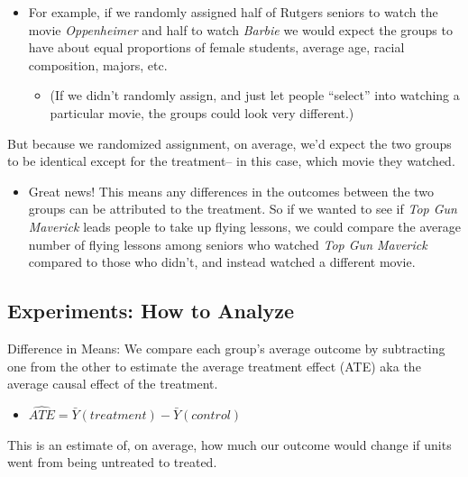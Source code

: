 \documentclass[
  letterpaper,
  DIV=11,
  numbers=noendperiod]{scrreprt}
\providecommand{\tightlist}{%
  \setlength{\itemsep}{0pt}\setlength{\parskip}{0pt}}\usepackage{longtable,booktabs,array}
\begin{document}
\begin{itemize}
\tightlist
\item
  For example, if we randomly assigned half of Rutgers seniors to watch
  the movie \emph{Oppenheimer} and half to watch \emph{Barbie} we would
  expect the groups to have about equal proportions of female students,
  average age, racial composition, majors, etc.

  \begin{itemize}
  \tightlist
  \item
    (If we didn't randomly assign, and just let people ``select'' into
    watching a particular movie, the groups could look very different.)
  \end{itemize}
\end{itemize}

But because we randomized assignment, on average, we'd expect the two
groups to be identical except for the treatment-- in this case, which
movie they watched.

\begin{itemize}
\tightlist
\item
  Great news! This means any differences in the outcomes between the two
  groups can be attributed to the treatment. So if we wanted to see if
  \emph{Top Gun Maverick} leads people to take up flying lessons, we
  could compare the average number of flying lessons among seniors who
  watched \emph{Top Gun Maverick} compared to those who didn't, and
  instead watched a different movie.
\end{itemize}

\hypertarget{experiments-how-to-analyze}{%
\subsection{Experiments: How to
Analyze}\label{experiments-how-to-analyze}}

Difference in Means: We compare each group's average outcome by
subtracting one from the other to estimate the average treatment effect
(ATE) aka the average causal effect of the treatment.

\begin{itemize}
\tightlist
\item
  \(\widehat{ATE} = \bar{Y}(treatment) - \bar{Y}(control)\)
\end{itemize}

This is an estimate of, on average, how much our outcome would change if
units went from being untreated to treated.
\end{document}

